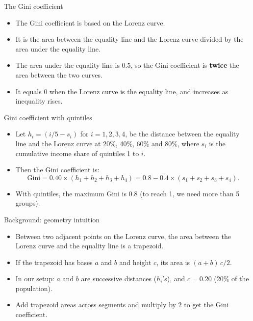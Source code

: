 \documentclass[aspectratio=169]{beamer}
\begin{document}
\begin{frame}{The Gini coefficient}
\transfade
\begin{itemize}[<+->]
\item The Gini coefficient is based on the Lorenz curve.
\item It is the area between the equality line and the Lorenz curve divided by the area under the equality line.
\item The area under the equality line is $0.5$, so the Gini coefficient is \textbf{twice} the area between the two curves.
\item It equals 0 when the Lorenz curve is the equality line, and increases as inequality rises.
\end{itemize}
\end{frame}

\begin{frame}{Gini coefficient with quintiles}
\transfade
\begin{itemize}[<+->]
\item Let $h_i=(i/5-s_i)$ for $i=1,2,3,4$, be the distance between the equality line and the Lorenz curve at 20\%, 40\%, 60\% and 80\%, where $s_i$ is the cumulative income share of quintiles 1 to $i$.
\item Then the Gini coefficient is:
\[
\text{Gini} = 0.40 \times (h_1+h_2+h_3+h_4) = 0.8-0.4\times(s_1+s_2+s_3+s_4).
\]
\item With quintiles, the maximum Gini is $0.8$ (to reach 1, we need more than 5 groups).
\end{itemize}
\end{frame}

\begin{frame}{Background: geometry intuition}
\transfade
\begin{itemize}[<+->]
\item Between two adjacent points on the Lorenz curve, the area between the Lorenz curve and the equality line is a trapezoid.
\item If the trapezoid has bases $a$ and $b$ and height $c$, its area is $(a+b)\,c/2$.
\item In our setup: $a$ and $b$ are successive distances ($h_i$'s), and $c=0.20$ (20\% of the population).
\item Add trapezoid areas across segments and multiply by 2 to get the Gini coefficient.
\end{itemize}
\end{frame}
\end{document}
